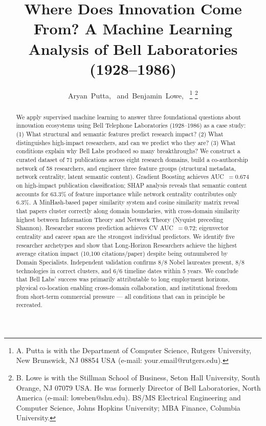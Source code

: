 \documentclass[journal]{IEEEtran}
\begin{document}
\title{Where Does Innovation Come From? A Machine Learning\\
Analysis of Bell Laboratories (1928--1986)}

\author{Aryan~Putta,~
and~Benjamin~Lowe,~
\thanks{A. Putta is with the Department of Computer Science, Rutgers University, New Brunswick, NJ 08854 USA (e-mail: your.email@rutgers.edu).}
\thanks{B. Lowe is with the Stillman School of Business, Seton Hall University, South Orange, NJ 07079 USA. He was formerly Director of Bell Laboratories, North America (e-mail: loweben@shu.edu). BS/MS Electrical Engineering and Computer Science, Johns Hopkins University; MBA Finance, Columbia University.}}

\maketitle

\begin{abstract}
We apply supervised machine learning to answer three foundational questions
about innovation ecosystems using Bell Telephone Laboratories (1928--1986) as
a case study: (1) What structural and semantic features predict research
impact? (2) What distinguishes high-impact researchers, and can we predict
who they are? (3) What conditions explain why Bell Labs produced so many
breakthroughs? We construct a curated dataset of 71 publications across eight
research domains, build a co-authorship network of 58 researchers, and engineer
three feature groups (structural metadata, network centrality, latent semantic
content). Gradient Boosting achieves AUC~$= 0.674$ on high-impact publication
classification; SHAP analysis reveals that semantic content accounts for 63.3\%
of feature importance while network centrality contributes only 6.3\%. A
MinHash-based paper similarity system and cosine similarity matrix reveal
that papers cluster correctly along domain boundaries, with cross-domain
similarity highest between Information Theory and Network Theory (Nyquist
preceding Shannon). Researcher success prediction achieves CV AUC~$= 0.72$;
eigenvector centrality and career span are the strongest individual predictors.
We identify five researcher archetypes and show that Long-Horizon Researchers
achieve the highest average citation impact (10,100 citations/paper) despite
being outnumbered by Domain Specialists. Independent validation confirms 8/8
Nobel laureates present, 8/8 technologies in correct clusters, and 6/6 timeline
dates within 5 years. We conclude that Bell Labs' success was primarily
attributable to long employment horizons, physical co-location enabling
cross-domain collaboration, and institutional freedom from short-term
commercial pressure --- all conditions that can in principle be recreated.
\end{abstract}
\end{document}

